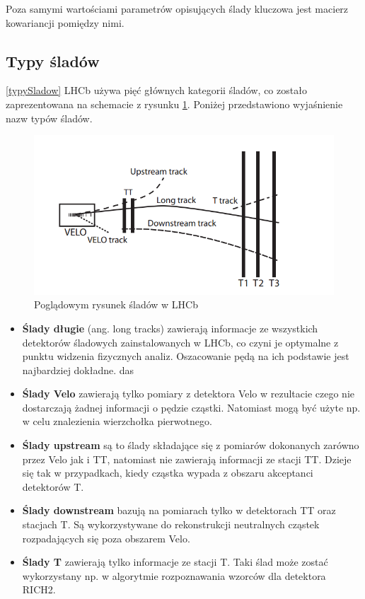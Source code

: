 Poza samymi wartościami parametrów opisujących ślady kluczowa jest macierz kowariancji pomiędzy nimi.

\subsection{Typy śladów}
\ref{typySladow}
LHCb używa pięć głównych kategorii śladów, co zostało zaprezentowana na schemacie z rysunku \ref{slady}. Poniżej przedstawiono wyjaśnienie nazw typów śladów.
\begin{figure}[h]
  \centering
  \includegraphics[scale=0.7]{rozdzial3/tracks.png}
  \caption{Poglądowym rysunek śladów w LHCb \cite{trackDefinition}}
  \label{slady}
\end{figure}
  
\begin{itemize}
\item \textbf{Ślady długie} (ang. long tracks) zawierają informacje ze wszystkich detektorów śladowych zainstalowanych w LHCb, co czyni je optymalne z punktu widzenia fizycznych analiz. Oszacowanie pędą na ich podstawie jest najbardziej dokładne. das
\item \textbf{Ślady Velo} zawierają tylko pomiary z detektora Velo w rezultacie czego nie dostarczają żadnej informacji o pędzie cząstki. Natomiast mogą być użyte np. w celu znalezienia wierzchołka pierwotnego. 
\item \textbf{Ślady upstream} są to ślady składające się z pomiarów dokonanych zarówno przez Velo jak i TT, natomiast nie zawierają informacji ze stacji TT. Dzieje się tak w przypadkach, kiedy cząstka wypada z obszaru akceptanci detektorów T.   
\item \textbf{Ślady downstream} bazują na pomiarach tylko w detektorach TT oraz stacjach T. Są wykorzystywane do rekonstrukcji neutralnych cząstek rozpadających się poza obszarem Velo. 
\item \textbf{Ślady T}  zawierają tylko informacje ze stacji T. Taki ślad może zostać wykorzystany np. w algorytmie rozpoznawania wzorców dla detektora RICH2. 
\end{itemize}
